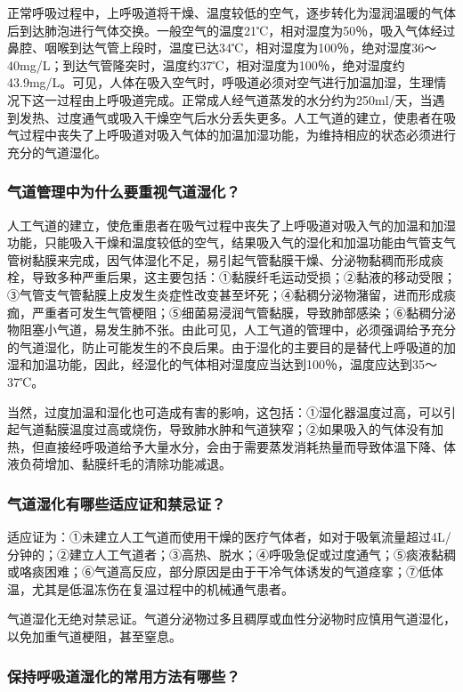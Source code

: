 正常呼吸过程中，上呼吸道将干燥、温度较低的空气，逐步转化为湿润温暖的气体后到达肺泡进行气体交换。一般空气的温度21℃，相对湿度为50％，吸入气体经过鼻腔、咽喉到达气管上段时，温度已达34℃，相对湿度为100％，绝对湿度36～40mg/L；到达气管隆突时，温度约37℃，相对湿度为100％，绝对湿度约43.9mg/L。可见，人体在吸入空气时，呼吸道必须对空气进行加温加湿，生理情况下这一过程由上呼吸道完成。正常成人经气道蒸发的水分约为250ml/天，当遇到发热、过度通气或吸入干燥空气后水分丢失更多。人工气道的建立，使患者在吸气过程中丧失了上呼吸道对吸入气体的加温加湿功能，为维持相应的状态必须进行充分的气道湿化。

\subsubsection{气道管理中为什么要重视气道湿化？}

人工气道的建立，使危重患者在吸气过程中丧失了上呼吸道对吸入气的加温和加湿功能，只能吸入干燥和温度较低的空气，结果吸入气的湿化和加温功能由气管支气管树黏膜来完成，因气体湿化不足，易引起气管黏膜干燥、分泌物黏稠而形成痰栓，导致多种严重后果，这主要包括：①黏膜纤毛运动受损；②黏液的移动受限；③气管支气管黏膜上皮发生炎症性改变甚至坏死；④黏稠分泌物潴留，进而形成痰痂，严重者可发生气管梗阻；⑤细菌易浸润气管黏膜，导致肺部感染；⑥黏稠分泌物阻塞小气道，易发生肺不张。由此可见，人工气道的管理中，必须强调给予充分的气道湿化，防止可能发生的不良后果。由于湿化的主要目的是替代上呼吸道的加湿和加温功能，因此，经湿化的气体相对湿度应当达到100％，温度应达到35～37℃。

当然，过度加温和湿化也可造成有害的影响，这包括：①湿化器温度过高，可以引起气道黏膜温度过高或烧伤，导致肺水肿和气道狭窄；②如果吸入的气体没有加热，但直接经呼吸道给予大量水分，会由于需要蒸发消耗热量而导致体温下降、体液负荷增加、黏膜纤毛的清除功能减退。

\subsubsection{气道湿化有哪些适应证和禁忌证？}

适应证为：①未建立人工气道而使用干燥的医疗气体者，如对于吸氧流量超过4L/分钟的；②建立人工气道者；③高热、脱水；④呼吸急促或过度通气；⑤痰液黏稠或咯痰困难；⑥气道高反应，部分原因是由于干冷气体诱发的气道痉挛；⑦低体温，尤其是低温冻伤在复温过程中的机械通气患者。

气道湿化无绝对禁忌证。气道分泌物过多且稠厚或血性分泌物时应慎用气道湿化，以免加重气道梗阻，甚至窒息。

\subsubsection{保持呼吸道湿化的常用方法有哪些？}

